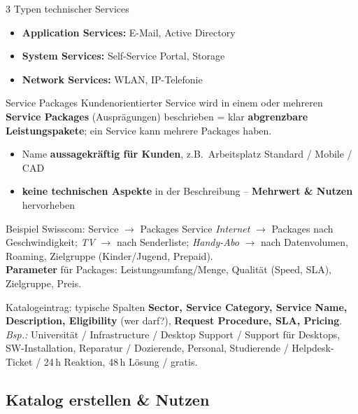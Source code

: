 \documentclass[a4paper, fontsize=7pt]{scrartcl}
\begin{document}
\begin{mainbox}{3 Typen technischer Services}
\begin{itemize}
    \item \textbf{Application Services:} E-Mail, Active Directory
    \item \textbf{System Services:} Self-Service Portal, Storage
    \item \textbf{Network Services:} WLAN, IP-Telefonie
\end{itemize}
\end{mainbox}

\begin{mainbox}{Service Packages}
Kundenorientierter Service wird in einem oder mehreren \textbf{Service
Packages} (Ausprägungen) beschrieben = klar \textbf{abgrenzbare
Leistungspakete}; ein Service kann mehrere Packages haben.
\begin{itemize}
    \item Name \textbf{aussagekräftig für Kunden}, z.B.\ Arbeitsplatz
          Standard / Mobile / CAD
    \item \textbf{keine technischen Aspekte} in der Beschreibung --
          \textbf{Mehrwert \& Nutzen} hervorheben
\end{itemize}
\end{mainbox}

\begin{subbox}{Beispiel Swisscom: Service $\to$ Packages}
Service \emph{Internet} $\to$ Packages nach Geschwindigkeit; \emph{TV}
$\to$ nach Senderliste; \emph{Handy-Abo} $\to$ nach Datenvolumen,
Roaming, Zielgruppe (Kinder/Jugend, Prepaid).\\
\textbf{Parameter} für Packages: Leistungsumfang/Menge, Qualität
(Speed, SLA), Zielgruppe, Preis.
\end{subbox}

\begin{subbox}{Katalogeintrag: typische Spalten}
\textbf{Sector, Service Category, Service Name, Description, Eligibility}
(wer darf?), \textbf{Request Procedure, SLA, Pricing}.\\
\emph{Bsp.:} Universität / Infrastructure / Desktop Support / Support für
Desktops, SW-Installation, Reparatur / Dozierende, Personal,
Studierende / Helpdesk-Ticket / 24\,h Reaktion, 48\,h Lösung / gratis.
\end{subbox}

\subsection{Katalog erstellen \& Nutzen}
\end{document}
